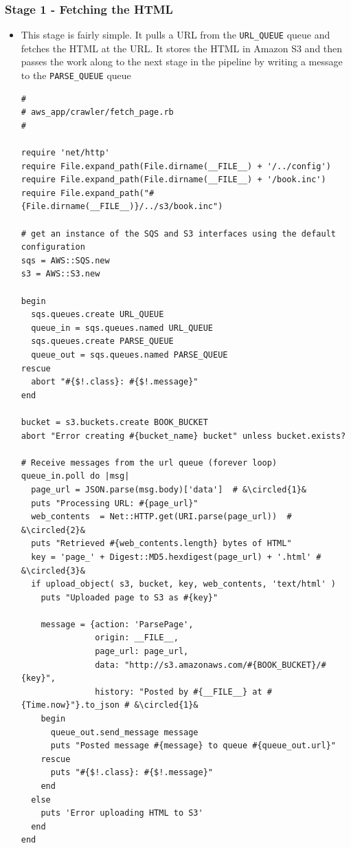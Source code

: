 \documentclass{beamer}
\newcommand*\circled[1]{\tikz[baseline=(char.base)]{
            \node[shape=circle,draw,inner sep=1pt] (char) {#1};}}
\begin{document}
\begin{frame}
\frametitle{Stage 1 - Fetching the HTML}

\begin{itemize}
 \item This stage is fairly simple. It pulls a URL from the \texttt{URL\_QUEUE} queue and fetches the
HTML at the URL. It stores the HTML in Amazon S3 and then passes the work along
to the next stage in the pipeline by writing a message to the \texttt{PARSE\_QUEUE} queue
\lstset{language=Ruby, style=eclipse}
\begin{lstlisting}
#
# aws_app/crawler/fetch_page.rb
#

require 'net/http'
require File.expand_path(File.dirname(__FILE__) + '/../config')
require File.expand_path(File.dirname(__FILE__) + '/book.inc')
require File.expand_path("#{File.dirname(__FILE__)}/../s3/book.inc")

# get an instance of the SQS and S3 interfaces using the default configuration
sqs = AWS::SQS.new
s3 = AWS::S3.new

begin
  sqs.queues.create URL_QUEUE
  queue_in = sqs.queues.named URL_QUEUE
  sqs.queues.create PARSE_QUEUE
  queue_out = sqs.queues.named PARSE_QUEUE
rescue
  abort "#{$!.class}: #{$!.message}"
end

bucket = s3.buckets.create BOOK_BUCKET
abort "Error creating #{bucket_name} bucket" unless bucket.exists?

# Receive messages from the url queue (forever loop)
queue_in.poll do |msg|
  page_url = JSON.parse(msg.body)['data']  # &\circled{1}&
  puts "Processing URL: #{page_url}"
  web_contents  = Net::HTTP.get(URI.parse(page_url))  # &\circled{2}&
  puts "Retrieved #{web_contents.length} bytes of HTML"
  key = 'page_' + Digest::MD5.hexdigest(page_url) + '.html' # &\circled{3}&
  if upload_object( s3, bucket, key, web_contents, 'text/html' )
    puts "Uploaded page to S3 as #{key}"

    message = {action: 'ParsePage',
               origin: __FILE__,
               page_url: page_url,
               data: "http://s3.amazonaws.com/#{BOOK_BUCKET}/#{key}",
               history: "Posted by #{__FILE__} at #{Time.now}"}.to_json # &\circled{1}&
    begin
      queue_out.send_message message
      puts "Posted message #{message} to queue #{queue_out.url}"
    rescue
      puts "#{$!.class}: #{$!.message}"
    end
  else
    puts 'Error uploading HTML to S3'
  end
end
\end{lstlisting}


\end{itemize}
\end{frame}
\end{document}
